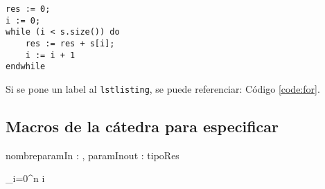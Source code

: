 \documentclass[10pt,a4paper]{article}
\begin{document}
	\begin{lstlisting}[caption={Ejemplo de código (usando los estilos de la cátedra, ver las macros para más detalles)},label=code:for]
res := 0;
i := 0;
while (i < s.size()) do
	res := res + s[i];
	i := i + 1
endwhile
	\end{lstlisting}

Si se pone un label al \verb|lstlisting|, se puede referenciar: Código \ref{code:for}.


\subsection{Macros de la cátedra para especificar}

\begin{proc}{nombre}{\In paramIn : \nat, \Inout paramInout : \TLista{\ent}}{tipoRes}
\end{proc}

 {\sum\limits_{i=0}^{n} i}

\end{document}
